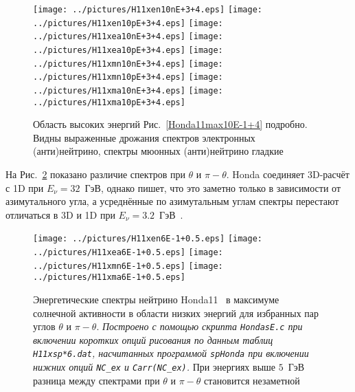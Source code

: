 \clearpage
\begin{figure}[!ht]
\texttt{[image: ../pictures/H11xen10nE+3+4.eps]}
\texttt{[image: ../pictures/H11xen10pE+3+4.eps]}
\texttt{[image: ../pictures/H11xea10nE+3+4.eps]}
\texttt{[image: ../pictures/H11xea10pE+3+4.eps]}
\texttt{[image: ../pictures/H11xmn10nE+3+4.eps]}
\texttt{[image: ../pictures/H11xmn10pE+3+4.eps]}
\texttt{[image: ../pictures/H11xma10nE+3+4.eps]}
\texttt{[image: ../pictures/H11xma10pE+3+4.eps]}
\caption{Область высоких энергий Рис.~\ref{Honda11max10E-1+4} подробно. Видны выраженные дрожания спектров электронных (анти)нейтрино, спектры мюонных (анти)нейтрино гладкие}
\label{Honda11max10E+3+4}
\end{figure}

На Рис.~\ref{Honda11max6E-1+0.5} показано различие спектров при $\theta$ и $\pi-\theta$. Honda соединяет 3D-расчёт с 1D при $E_{\nu}=32$~ГэВ, однако пишет, что это заметно только в зависимости от азимутального угла, а усреднённые по азимутальным углам спектры перестают отличаться в 3D и 1D при $E_{\nu}=3.2$~ГэВ~\cite{Honda:2011nf}.
\begin{figure}[!ht]
\texttt{[image: ../pictures/H11xen6E-1+0.5.eps]}
\texttt{[image: ../pictures/H11xea6E-1+0.5.eps]}
\texttt{[image: ../pictures/H11xmn6E-1+0.5.eps]}
\texttt{[image: ../pictures/H11xma6E-1+0.5.eps]}
\caption{Энергетические спектры нейтрино Honda11~\cite{Honda:2011nf} в максимуме солнечной активности в области низких энергий для избранных пар углов $\theta$ и $\pi-\theta$. \textit{Построено с помощью скрипта \texttt{HondasE.c} при включении коротких опций рисования по данным таблиц \texttt{H11xsp*6.dat}, насчитанных программой \texttt{spHonda} при включении нижних опций \texttt{NC\_ex} и \texttt{Carr(NC\_ex)}.} При энергиях выше $5$~ГэВ разница между спектрами при $\theta$ и $\pi-\theta$ становится незаметной}
\label{Honda11max6E-1+0.5}
\end{figure}

